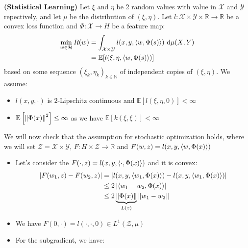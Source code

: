 \begin{definition}{\textbf{(Statistical Learning)}}
    Let $\xi$ and $\eta$ be 2 random values with value in $\mathcal{X}$ and $\mathcal{Y}$ repectively, and let $\mu$ be the distribution of $(\xi,\eta)$. Let $l:\mathcal{X}\times\mathcal{Y}\times \mathbb{R}\rightarrow \mathbb{R}$ be a convex loss function and $\Phi:\mathcal{X}\rightarrow H$ be a feature map:
    \begin{equation*}
    \begin{aligned}
        \min_{w\in\mathcal{H}} R(w) &= \int_{\mathcal{X}\times\mathcal{Y}} l(x, y, \left\langle w, \Phi(s) \right\rangle)\ \mathrm{d}\mu(X, Y) \\ 
        &= \mathbb{E}[l(\xi, \eta, \left\langle w, \Phi(s) \right\rangle)]
    \end{aligned}
    \end{equation*}
    based on some sequence $(\xi_k,\eta_k)_{k\in\mathbb{N}}$ of independent copies of $(\xi, \eta)$. We assume:
    \begin{itemize}
        \item $l(x, y, \cdot)$ is $2$-Lipschitz continuous and $\mathbb{E}[l(\xi, \eta, 0)]<\infty$ 
        \item $\mathbb{E}\left[ \left\lVert\Phi(x)\right\rVert^2  \right]\le\infty$ as we have $\mathbb{E}[k(\xi, \xi)]<\infty$
    \end{itemize}
    We will now check that the assumption for stochastic optimization holds, where we will set $\mathcal{Z}=\mathcal{X}\times\mathcal{Y}$, $F:H\times\mathcal{Z}\rightarrow \mathbb{R}$ and $F(w, z) = l(x, y, \left\langle w, \Phi(x) \right\rangle)$
    \begin{itemize}
        \item Let's consider the $F(\cdot, z) = l(x, y, \left\langle \cdot, \Phi(x) \right\rangle)$ and it is convex:
        \begin{equation*}
        \begin{aligned}
            \left| F(w_1, z) - F(w_2, z) \right| &= \left| l(x, y, \left\langle w_1, \Phi(x) \right\rangle) - l(x, y, \left\langle w_1, \Phi(x) \right\rangle) \right| \\
            &\le 2\left| \left\langle w_1-w_2, \Phi(x) \right\rangle \right| \\
            &\le 2\underbrace{\left\lVert\Phi(x)\right\rVert}_{L(z)}\left\lVert w_1-w_2\right\rVert
        \end{aligned}
        \end{equation*}
        \item We have $F(0, \cdot) = l(\cdot, \cdot, 0) \in L^1(\mathcal{Z},\mu)$
        \item For the subgradient, we have:
        \begin{equation*}

\end{equation*}
\end{itemize}
\end{definition}
